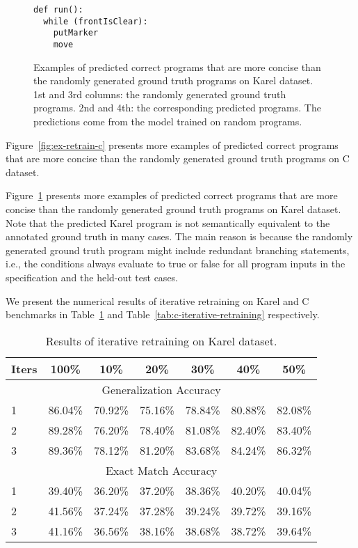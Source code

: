 \begin{figure}
\begin{minipage}{0.20\textwidth}
\begin{verbatim}
def run():
  while (frontIsClear):
    putMarker
    move
\end{verbatim}
\end{minipage}
\caption{\small Examples of predicted correct programs that are more concise than the randomly generated ground truth programs on Karel dataset. 1st and 3rd columns: the randomly generated ground truth programs. 2nd and 4th: the corresponding predicted programs. The predictions come from the model trained on random programs.}
\label{fig:ex-retrain-karel}
\vspace{-0.15in}
\end{figure}

Figure~\ref{fig:ex-retrain-c} presents more examples of predicted correct programs that are more concise than the randomly generated ground truth programs on C dataset.

Figure~\ref{fig:ex-retrain-karel} presents more examples of predicted correct programs that are more concise than the randomly generated ground truth programs on Karel dataset. Note that the predicted Karel program is not semantically equivalent to the annotated ground truth in many cases. The main reason is because the randomly generated ground truth program might include redundant branching statements, i.e., the conditions always evaluate to true or false for all program inputs in the specification and the held-out test cases.

We present the numerical results of iterative retraining on Karel and C benchmarks in Table~\ref{tab:karel-iterative-retraining} and Table~\ref{tab:c-iterative-retraining} respectively.

\begin{table}[t]
\caption{Results of iterative retraining on Karel dataset.}
\label{tab:karel-iterative-retraining}
\centering
\begin{tabular}{lc|ccccc}
\toprule
\textbf{Iters} & \textbf{100\%}  & \textbf{10\%} & \textbf{20\%} & \textbf{30\%} & \textbf{40\%} & \textbf{50\%}\\
\hline
\multicolumn{7}{c}{Generalization Accuracy} \\
\hline
1 & 86.04\% & 70.92\% & 75.16\% & 78.84\% & 80.88\% & 82.08\% \\
2 & 89.28\% & 76.20\% & 78.40\% & 81.08\% & 82.40\% & 83.40\% \\
3 & 89.36\% & 78.12\% & 81.20\% & 83.68\% & 84.24\% & 86.32\% \\
\hline
\multicolumn{7}{c}{Exact Match Accuracy} \\
\hline
1 & 39.40\% & 36.20\% & 37.20\% & 38.36\% & 40.20\% & 40.04\% \\
2 & 41.56\% & 37.24\% & 37.28\% & 39.24\% & 39.72\% & 39.16\% \\
3 & 41.16\% & 36.56\% & 38.16\% & 38.68\% & 38.72\% & 39.64\% \\
\bottomrule
\end{tabular}
\end{table}

